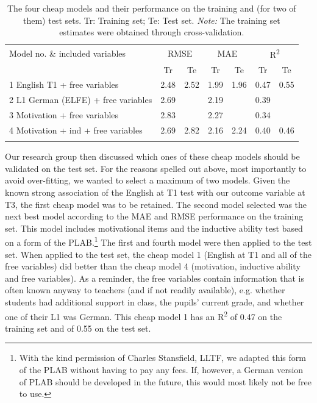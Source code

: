 \documentclass[output=paper]{langsci/langscibook}
\begin{document}
\begin{table}
\caption{The four cheap models and their performance on the training and (for two of them) test sets. Tr: Training set; Te: Test set. \emph{Note:} The training set estimates were obtained through cross-validation.\label{tab:04:3}}
\begin{tabular}{l cc cc cc}
\lsptoprule
 Model no. \& included variables & \multicolumn{2}{c}{RMSE} & \multicolumn{2}{c}{MAE} & \multicolumn{2}{c}{R\textsuperscript{2}}\\\cmidrule(lr){2-3}\cmidrule(lr){4-5}\cmidrule(lr){6-7}
                             &  Tr & Te &  Tr & Te &  Tr & Te\\\midrule
1 English T1 + free variables & 2.48 & 2.52 & 1.99 & 1.96 & 0.47 & 0.55\\
2 L1 German (ELFE) + free variables & 2.69 &  & 2.19 &  & 0.39 & \\
3 Motivation + free variables & 2.83 &  & 2.27 &  & 0.34 & \\
4 Motivation + ind + free variables & 2.69 & 2.82 & 2.16 & 2.24 & 0.40 & 0.46\\
\lspbottomrule
\end{tabular}
\textup{}
\end{table}


Our research group then discussed which ones of these cheap models should be validated on the test set. For the reasons spelled out above, most importantly to avoid over-fitting, we wanted to select a maximum of two models. Given the known strong association of the English at T1 test with our outcome variable at T3, the first cheap model was to be retained. The second model selected was the next best model according to the MAE and RMSE performance on the training set. This model includes motivational items and the inductive ability test based on a form of the PLAB.\footnote{With the kind permission of Charles Stansfield, LLTF, we adapted this form of the PLAB without having to pay any fees. If, however, a German version of PLAB should be developed in the future, this would most likely not be free to use.} The first and fourth model were then applied to the test set. When applied to the test set, the cheap model 1 (English at T1 and all of the free variables) did better than the cheap model 4 (motivation, inductive ability and free variables). As a reminder, the free variables contain information that is often known anyway to teachers (and if not readily available), e.g. whether students had additional support in class, the pupils’ current grade, and whether one of their L1 was German. This cheap model 1 has an R\textsuperscript{2} of 0.47 on the training set and of 0.55 on the test set. 
\end{document}
